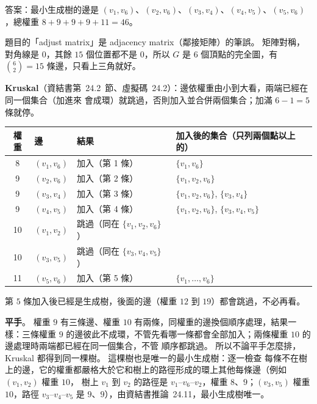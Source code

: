 \begin{pastsoln}
答案：最小生成樹的邊是 $(v_1, v_6)$、$(v_2, v_6)$、$(v_3, v_4)$、$(v_4, v_5)$、$(v_5, v_6)$，總權重
$8 + 9 + 9 + 9 + 11 = 46$。

題目的「adjust matrix」是 adjacency matrix（鄰接矩陣）的筆誤。 矩陣對稱，對角線是 $0$，其餘
$15$ 個位置都不是 $0$，所以 $G$ 是 $6$ 個頂點的完全圖，有 $\binom{6}{2} = 15$ 條邊，只看上三角就好。

\textbf{Kruskal}（資結書第~24.2~節、虛擬碼~24.2）：邊依權重由小到大看，兩端已經在同一個集合（加進來
會成環）就跳過，否則加入並合併兩個集合；加滿 $6 - 1 = 5$ 條就停。
\begin{center}
\small
\begin{tabular}{clll}
\toprule
權重 & 邊 & 結果 & 加入後的集合（只列兩個點以上的） \\
\midrule
8 & $(v_1, v_6)$ & 加入（第 1 條） & $\{v_1, v_6\}$ \\
9 & $(v_2, v_6)$ & 加入（第 2 條） & $\{v_1, v_2, v_6\}$ \\
9 & $(v_3, v_4)$ & 加入（第 3 條） & $\{v_1, v_2, v_6\}$, $\{v_3, v_4\}$ \\
9 & $(v_4, v_5)$ & 加入（第 4 條） & $\{v_1, v_2, v_6\}$, $\{v_3, v_4, v_5\}$ \\
10 & $(v_1, v_2)$ & 跳過（同在 $\{v_1, v_2, v_6\}$） & \\
10 & $(v_3, v_5)$ & 跳過（同在 $\{v_3, v_4, v_5\}$） & \\
11 & $(v_5, v_6)$ & 加入（第 5 條） & $\{v_1, \ldots, v_6\}$ \\
\bottomrule
\end{tabular}
\end{center}
第 $5$ 條加入後已經是生成樹，後面的邊（權重 $12$ 到 $19$）都會跳過，不必再看。

\textbf{平手}。 權重 $9$ 有三條邊、權重 $10$ 有兩條，同權重的邊換個順序處理，結果一樣：三條權重 $9$
的邊彼此不成環，不管先看哪一條都會全部加入；兩條權重 $10$ 的邊處理時兩端都已經在同一個集合，不管
順序都跳過。 所以不論平手怎麼排，Kruskal 都得到同一棵樹。 這棵樹也是唯一的最小生成樹：逐一檢查
每條不在樹上的邊，它的權重都嚴格大於它和樹上的路徑形成的環上其他每條邊（例如 $(v_1, v_2)$ 權重 $10$，
樹上 $v_1$ 到 $v_2$ 的路徑是 $v_1$--$v_6$--$v_2$，權重 $8$、$9$；$(v_3, v_5)$ 權重 $10$，路徑
$v_3$--$v_4$--$v_5$ 是 $9$、$9$），由資結書推論~24.11，最小生成樹唯一。

\begin{center}
\end{center}
\end{pastsoln}
